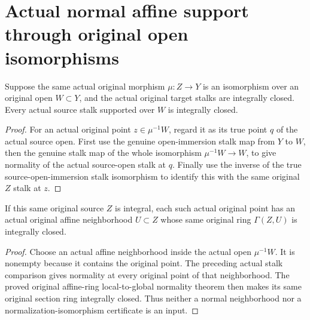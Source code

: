 \section{Actual normal affine support through original open isomorphisms}

\begin{theorem}
\label{thm:actual-normal-stalk-over-open-isomorphism}
\leanok
Suppose the same actual original morphism $\mu:Z\to Y$ is an isomorphism over
an original open $W\subset Y$, and the actual original target stalks are
integrally closed. Every actual source stalk supported over $W$ is integrally
closed.
\end{theorem}
\begin{proof}
For an actual original point $z\in\mu^{-1}W$, regard it as its true point
$q$ of the actual source open. First use the genuine open-immersion stalk map
from $Y$ to $W$, then the genuine stalk map of the whole isomorphism
$\mu^{-1}W\to W$, to give normality of the actual source-open stalk at $q$.
Finally use the inverse of the true source-open-immersion stalk isomorphism
to identify this with the same original $Z$ stalk at $z$.
\end{proof}

\begin{theorem}
\label{thm:actual-normal-affine-neighborhood-over-open-isomorphism}
\leanok
{}
If this same original source $Z$ is integral, each such actual original point
has an actual original affine neighborhood $U\subset Z$ whose same original
ring $\Gamma(Z,U)$ is integrally closed.
\end{theorem}
\begin{proof}
Choose an actual affine neighborhood inside the actual open $\mu^{-1}W$.
It is nonempty because it contains the original point. The preceding actual
stalk comparison gives normality at every original point of that neighborhood.
The proved original affine-ring local-to-global normality theorem then makes
its same original section ring integrally closed. Thus neither a normal
neighborhood nor a normalization-isomorphism certificate is an input.
\end{proof}

